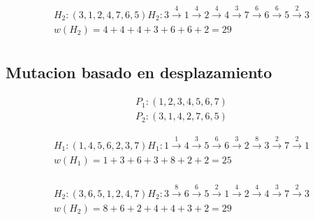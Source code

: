\documentclass{article}
\begin{document}
\begin{equation*}
  \begin{split}
    H_2: (3,1,2,4,7,6,5) H_2: 3 \overset{4}{\rightarrow} 1 \overset{4}{\rightarrow} 2 \overset{4}{\rightarrow} 4 \overset{3}{\rightarrow} 7 \overset{6}{\rightarrow} 6 \overset{6}{\rightarrow} 5 \overset{2}{\rightarrow} 3\\
    w(H_2) = 4 + 4 + 4 + 3 + 6 + 6 + 2 = 29\\
  \end{split}
\end{equation*}

\subsection{Mutacion basado en desplazamiento}
\begin{equation*}
  \begin{split}
    P_1: (1,\boxed{2,3},4,5,6,7)\\
    P_2: (3,1,4,2,7,\boxed{6,5})
  \end{split}
\end{equation*}

\begin{equation*}
  \begin{split}
    H_1: (1,4,5,6,2,3,7) H_1: 1 \overset{1}{\rightarrow} 4 \overset{3}{\rightarrow} 5 \overset{6}{\rightarrow} 6 \overset{3}{\rightarrow} 2 \overset{8}{\rightarrow} 3 \overset{2}{\rightarrow} 7 \overset{2}{\rightarrow} 1\\
    w(H_1) = 1 + 3 + 6 + 3 + 8 + 2 + 2 = 25\\
  \end{split}
\end{equation*}

\begin{equation*}
  \begin{split}
    H_2: (3,6,5,1,2,4,7) H_2: 3 \overset{8}{\rightarrow} 6 \overset{6}{\rightarrow} 5 \overset{2}{\rightarrow} 1 \overset{4}{\rightarrow} 2 \overset{4}{\rightarrow} 4 \overset{3}{\rightarrow} 7 \overset{2}{\rightarrow} 3\\
    w(H_2) = 8 + 6 + 2 + 4 + 4 + 3 + 2 = 29\\
  \end{split}
\end{equation*}
\end{document}
